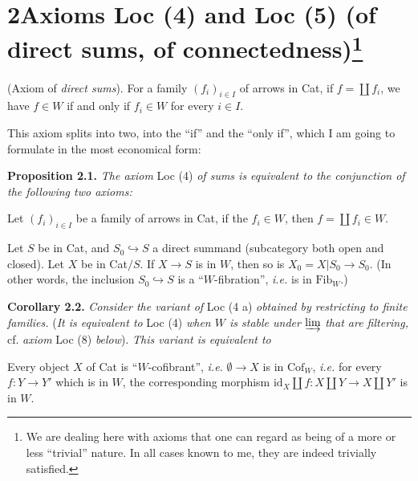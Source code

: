 \documentclass[11pt]{article}
\newcommand{\printedpage}[1]{\marginpar{\footnotesize p.~#1}}
\newcommand{\msp}[1]{\marginpar{\footnotesize [#1]}}
\begin{document}
\printedpage{5}
\section*{2\quad Axioms Loc (4) and Loc (5) (of direct sums, of connectedness)\protect\footnote{We are dealing here with axioms that one can regard as being of a more or less ``trivial'' nature. In all cases known to me, they are indeed trivially satisfied.}}

\begin{description}[leftmargin=7em, labelwidth=6em]
\item[Loc (4)] (Axiom of \textit{direct sums}). For a family $(f_i)_{i\in I}$ of arrows in Cat, if $f = \coprod f_i$, we have $f \in W$ if and only if $f_i \in W$ for every $i \in I$.
\end{description}

This axiom splits into two, into the ``if'' and the ``only if'', which I am going to formulate in the most economical form:

\textbf{Proposition 2.1.} \textit{The axiom} Loc (4) \textit{of sums is equivalent to the conjunction of the following two axioms:}

\begin{description}[leftmargin=7em, labelwidth=6em]
\item[Loc (4 a)] \msp{page 9}Let $(f_i)_{i\in I}$ be a family of arrows in Cat, if the $f_i \in W$, then $f = \coprod f_i \in W$.
\item[Loc (4 b)] Let $S$ be in Cat, and $S_0 \hookrightarrow S$ a direct summand (subcategory both open and closed). Let $X$ be in Cat$/S$. If $X \longrightarrow S$ is in $W$, then so is $X_0 = X|S_0 \longrightarrow S_0$. (In other words, the inclusion $S_0 \hookrightarrow S$ is a ``$W$-fibration'', \textit{i.e.} is in $\mathrm{Fib}_W$.)
\end{description}

\textbf{Corollary 2.2.} \textit{Consider the variant of} Loc (4 a) \textit{obtained by restricting to finite families.} (\textit{It is equivalent to} Loc (4) \textit{when $W$ is stable under} $\varinjlim$ \textit{that are filtering,} cf. \textit{axiom} Loc (8) \textit{below}). \textit{This variant is equivalent to}

\begin{description}[leftmargin=7.5em, labelwidth=6.5em]
\item[Loc (4 a$_0$)] Every object $X$ of Cat is ``$W$-cofibrant'', \textit{i.e.} $\emptyset \longrightarrow X$ is in $\mathrm{Cof}_W$, \textit{i.e.} for every $f : Y \longrightarrow Y'$ which is in $W$, the corresponding morphism $\mathrm{id}_X \amalg f : X \amalg Y \longrightarrow X \amalg Y'$ is in $W$.
\end{description}
\end{document}
